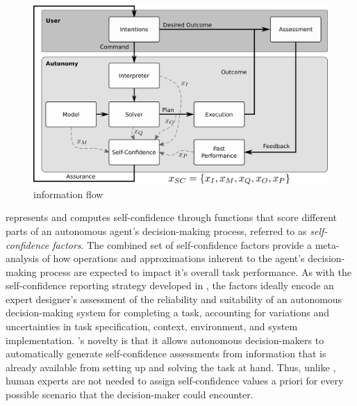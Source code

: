 
\begin{figure}[tbp]
        \centering
        \includegraphics[width=0.8\linewidth]{Figures/FaMSeC.png}
        \caption{\famsec{} information flow}
        \label{fig:famsec}
        \vspace{-0.5 cm}
\end{figure}

\famsec{} represents and computes self-confidence through functions that score different parts of an autonomous agent's decision-making process, referred to as \emph{self-confidence factors}. The combined set of self-confidence factors provide a meta-analysis of how operations and approximations inherent to the agent's decision-making process are expected to impact it's overall task performance. 
As with the self-confidence reporting strategy developed in \cite{Hutchins2015-if}, the factors ideally encode an expert designer's assessment of the reliability and suitability of an autonomous decision-making system for completing a task, accounting for variations and uncertainties in task specification, context, environment, and system implementation. \famsec{}'s novelty is that it allows autonomous decision-makers to automatically generate self-confidence assessments from information that is already available from setting up and solving the task at hand. Thus, unlike \cite{Hutchins2015-if}, human experts are not needed to assign self-confidence values a priori for every possible scenario that the decision-maker could encounter. %

